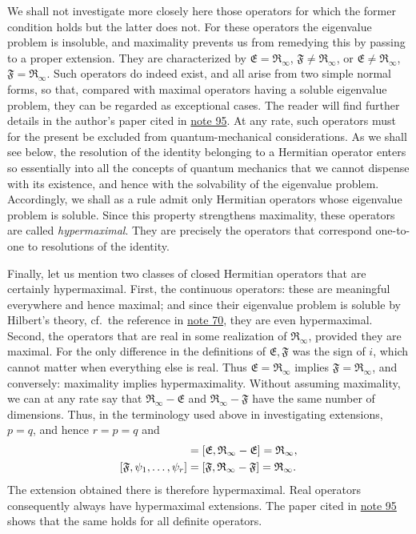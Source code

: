 \documentclass[fontsize=13pt,twoside,openany,headings=normal,parskip=false,bookmarkpackage=false,DIV=calc]{scrbook}
\begin{document}
We shall not investigate more closely here those operators for which the former condition holds but the latter does not. For these operators the eigenvalue problem is insoluble, and maximality prevents us from remedying this by passing to a proper extension. They are characterized by $\mathfrak E=\mathfrak R_\infty$, $\mathfrak F\ne\mathfrak R_\infty$, or $\mathfrak E\ne\mathfrak R_\infty$, $\mathfrak F=\mathfrak R_\infty$. Such operators do indeed exist, and all arise from two simple normal forms, so that, compared with maximal operators having a soluble eigenvalue problem, they can be regarded as exceptional cases. The reader will find further details in the author's paper cited in \hyperlink{note-95}{note 95}. At any rate, such operators must for the present be excluded from quantum-mechanical considerations. As we shall see below, the resolution of the identity belonging to a Hermitian operator enters so essentially into all the concepts of quantum mechanics
\hypertarget{origpage-88}{}%
that we cannot dispense with its existence, and hence with the solvability of the eigenvalue problem. Accordingly, we shall as a rule admit only Hermitian operators whose eigenvalue problem is soluble. Since this property strengthens maximality, these operators are called \emph{hypermaximal}. They are precisely the operators that correspond one-to-one to resolutions of the identity.

Finally, let us mention two classes of closed Hermitian operators that are certainly hypermaximal. First, the continuous operators: these are meaningful everywhere and hence maximal; and since their eigenvalue problem is soluble by Hilbert's theory, cf.\ the reference in \hyperlink{note-70}{note 70}, they are even hypermaximal. Second, the operators that are real in some realization of $\mathfrak R_\infty$, provided they are maximal. For the only difference in the definitions of $\mathfrak E,\mathfrak F$ was the sign of $i$, which cannot matter when everything else is real. Thus $\mathfrak E=\mathfrak R_\infty$ implies $\mathfrak F=\mathfrak R_\infty$, and conversely: maximality implies hypermaximality. Without assuming maximality, we can at any rate say that $\mathfrak R_\infty-\mathfrak E$ and $\mathfrak R_\infty-\mathfrak F$ have the same number of dimensions. Thus, in the terminology used above in investigating extensions, $p=q$, and hence $r=p=q$ and
\begin{align*}
[\mathfrak E,\varphi_1,\ldots,\varphi_r]&=[\mathfrak E,\mathfrak R_\infty-\mathfrak E]=\mathfrak R_\infty,\\
\relax[\mathfrak F,\psi_1,\ldots,\psi_r]&=[\mathfrak F,\mathfrak R_\infty-\mathfrak F]=\mathfrak R_\infty.
\end{align*}
The extension obtained there is therefore hypermaximal. Real operators consequently always have hypermaximal extensions. The paper cited in \hyperlink{note-95}{note 95} shows that the same holds for all definite operators.
\end{document}
